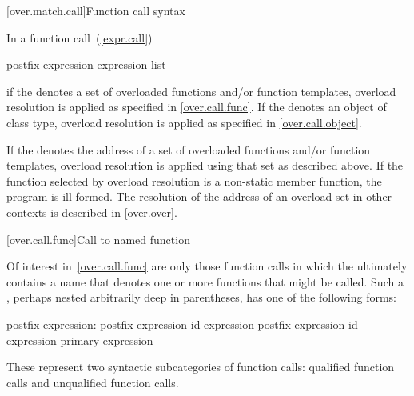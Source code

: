 [over.match.call]{Function call syntax}%

\pnum
In a function call~(\ref{expr.call})

\begin{ncsimplebnf}
postfix-expression \terminal{(} expression-list\opt \terminal{)}
\end{ncsimplebnf}

if the  denotes a set of overloaded functions and/or
function templates, overload resolution is applied as specified in \ref{over.call.func}.
If the  denotes an object of class type, overload
resolution is applied as specified in \ref{over.call.object}.

\pnum
If the  denotes the address of a set of overloaded
functions and/or function templates, overload resolution is applied using that set as
described above. If the function selected by overload resolution is a non-static member
function, the program is ill-formed. \enternote The resolution of the address of an
overload set in other contexts is described in \ref{over.over}. \exitnote

[over.call.func]{Call to named function}

\pnum
Of interest in~\ref{over.call.func} are only those function calls in
which the
ultimately contains a name that
denotes one or more functions that might be called.
Such a
,
perhaps nested arbitrarily deep in
parentheses, has one of the following forms:

\begin{ncbnf}
postfix-expression:\br
    postfix-expression  id-expression\br
    postfix-expression \terminal{->} id-expression\br
    primary-expression
\end{ncbnf}

These represent two syntactic subcategories of function calls:
qualified function calls and unqualified function calls.

